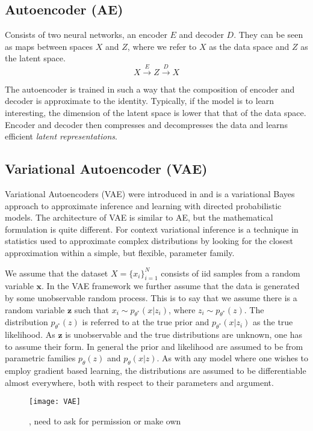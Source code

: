 \documentclass[../../thesis.tex]{subfiles}
\begin{document}
\subsection{Autoencoder (AE)}

Consists of two neural networks, an encoder $E$ and decoder $D$. They can be seen as maps between spaces $X$ and $Z$, where we refer to $X$ as the data space and $Z$ as the latent space. 
\begin{equation}
    X \xrightarrow{E} Z \xrightarrow{D} X 
\end{equation}

The autoencoder is trained in such a way that the composition of encoder and decoder is approximate to the identity. Typically, if the model is to learn interesting, the dimension of the latent space is lower that that of the data space. Encoder and decoder then compresses and decompresses the data and learns efficient \textit{latent representations}. 

\subsection{Variational Autoencoder (VAE)}
Variational Autoencoders (VAE) were introduced in \cite{kingma2022autoencoding} and is a variational Bayes approach to approximate inference and learning with directed probabilistic models. The architecture of VAE is similar to AE, but the mathematical formulation is quite different. For context variational inference is a technique in statistics used to approximate complex distributions by looking for the closest approximation within a simple, but flexible, parameter family. \newline 


We assume that the dataset $X = \{x_i\}_{i=1}^{N}$ consists of iid samples from a random variable $\mathbf{x}$. In the VAE framework we further assume that the data is generated by some unobservable random process. This is to say that we assume there is a random variable $\mathbf{z}$ such that $x_i \sim p_{\theta^*}(x|z_i)$, where $z_i \sim p_{\theta^*}(z)$. The distribution $p_{\theta^*}(z)$ is referred to at the true prior and $p_{\theta^*}(x|z_i)$ as the true likelihood. As $\mathbf{z}$ is unobservable and the true distributions are unknown, one has to assume their form. In general the prior and likelihood are assumed to be from parametric families $p_{\theta}(z)$ and $p_{\theta}(x|z)$. As with any model where one wishes to employ gradient based learning, the distributions are assumed to be differentiable almost everywhere, both with respect to their parameters and argument.\newline
\begin{figure}[h]
    \texttt{[image: VAE]}
    \centering  
    \caption{\cite{VAE}, need to ask for permission or make own}  
\end{figure}
\end{document}
